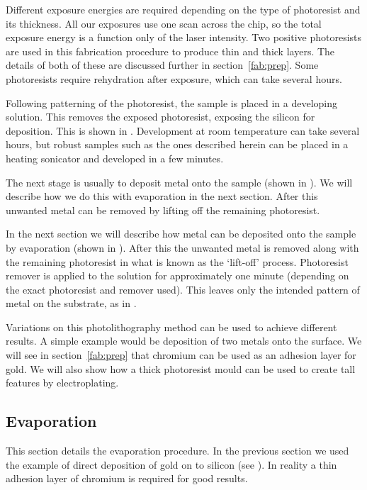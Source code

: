 Different exposure energies are required depending on the type of photoresist
and its thickness. All our exposures use one scan across the chip, so the total
exposure energy is a function only of the laser intensity.
%
%
Two positive photoresists are used in this fabrication procedure to produce
thin and thick layers. The details of both of these are discussed further in
section~\ref{fab:prep}. Some photoresists require rehydration after exposure,
which can take several hours.

Following patterning of the photoresist, the sample is placed in a developing
solution. This removes the exposed photoresist, exposing the silicon for
deposition. This is shown in . Development at
room temperature can take several hours, but robust samples such as the ones
described herein can be placed in a heating sonicator and developed in a few
minutes.

The next stage is usually to deposit metal onto the sample (shown in
). We will describe how we do this with
evaporation in the next section. After this unwanted metal can be removed by
lifting off the remaining photoresist. 

In the next section we will describe how metal can be deposited onto the sample
by evaporation (shown in ). After this the
unwanted metal is removed along with the remaining photoresist in what is known
as the `lift-off' process. Photoresist remover is applied to the solution for
approximately one minute (depending on the exact photoresist and remover used).
This leaves only the intended pattern of metal on the substrate, as in
.

Variations on this photolithography method can be used to achieve different
results. A simple example would be deposition of two metals onto the surface.
We will see in section~\ref{fab:prep} that chromium can be used as an
adhesion layer for gold. We will also show how a thick photoresist mould can be
used to create tall features by electroplating.

\subsection{Evaporation}
\label{fab:evap}

This section details the evaporation procedure. In the previous section we used
the example of direct deposition of gold on to silicon (see
). In reality a thin adhesion layer of chromium
is required for good results.~\cite{Madou2002}

